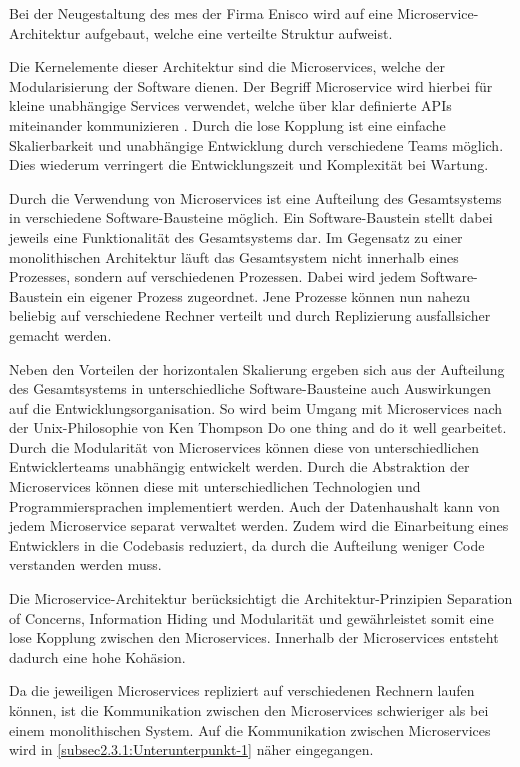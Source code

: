 Bei der Neugestaltung des \gls{mes} der Firma Enisco wird auf eine Microservice-Architektur aufgebaut, welche eine verteilte Struktur aufweist.

Die Kernelemente dieser Architektur sind die Microservices, welche der Modularisierung der Software dienen. Der Begriff Microservice wird hierbei für kleine unabhängige Services verwendet, welche über klar definierte APIs miteinander kommunizieren \cite{AmazonWebServicesInc..2021}. Durch die lose Kopplung ist eine einfache Skalierbarkeit und unabhängige Entwicklung durch verschiedene Teams möglich. Dies wiederum verringert die Entwicklungszeit und Komplexität bei Wartung.

Durch die Verwendung von Microservices ist eine Aufteilung des Gesamtsystems in verschiedene Software-Bausteine möglich. Ein Software-Baustein stellt dabei jeweils eine Funktionalität des Gesamtsystems dar. Im Gegensatz zu einer monolithischen Architektur läuft das Gesamtsystem nicht innerhalb eines Prozesses, sondern auf verschiedenen Prozessen. Dabei wird jedem Software-Baustein ein eigener Prozess zugeordnet. Jene Prozesse können nun nahezu beliebig auf verschiedene Rechner verteilt und durch Replizierung ausfallsicher gemacht werden. \cite{GaryCalcott.2018}

Neben den Vorteilen der horizontalen Skalierung ergeben sich aus der Aufteilung des Gesamtsystems in unterschiedliche Software-Bausteine auch Auswirkungen auf die Entwicklungsorganisation. So wird beim Umgang mit Microservices nach der Unix-Philosophie von Ken Thompson \glqq Do one thing and do it well\grqq{} \cite{IONOSSE.2021} gearbeitet. Durch die Modularität von Microservices können diese von unterschiedlichen Entwicklerteams unabhängig entwickelt werden. Durch die Abstraktion der Microservices können diese mit unterschiedlichen Technologien und Programmiersprachen implementiert werden. Auch der Datenhaushalt kann von jedem Microservice separat verwaltet werden. Zudem wird die Einarbeitung eines Entwicklers in die Codebasis reduziert, da durch die Aufteilung weniger Code verstanden werden muss.

Die Microservice-Architektur berücksichtigt die Architektur-Prinzipien Separation of Concerns, Information Hiding und Modularität und gewährleistet somit eine lose Kopplung zwischen den Microservices. Innerhalb der Microservices entsteht dadurch eine hohe Kohäsion.

Da die jeweiligen Microservices repliziert auf verschiedenen Rechnern laufen können, ist die Kommunikation zwischen den Microservices schwieriger als bei einem monolithischen System. Auf die Kommunikation zwischen Microservices wird in \autoref{subsec2.3.1:Unterunterpunkt-1} näher eingegangen.

